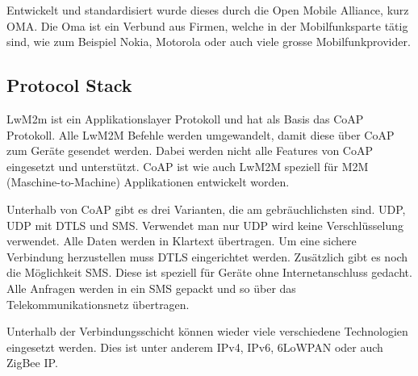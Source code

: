 Entwickelt und standardisiert wurde dieses durch die Open Mobile Alliance, kurz OMA. Die Oma ist ein Verbund aus Firmen, welche in der Mobilfunksparte tätig sind, wie zum Beispiel Nokia, Motorola oder auch viele grosse Mobilfunkprovider. 

\subsection{Protocol Stack}

LwM2m ist ein Applikationslayer Protokoll und hat als Basis das CoAP Protokoll. Alle LwM2M Befehle werden umgewandelt, damit diese über CoAP zum Geräte gesendet werden. Dabei werden nicht alle Features von CoAP eingesetzt und unterstützt. CoAP ist wie auch LwM2M speziell für M2M (Maschine-to-Machine) Applikationen entwickelt worden.

Unterhalb von CoAP gibt es drei Varianten, die am gebräuchlichsten sind. UDP, UDP mit DTLS und SMS. Verwendet man nur UDP wird keine Verschlüsselung verwendet. Alle Daten werden in Klartext übertragen. Um eine sichere Verbindung herzustellen muss DTLS eingerichtet werden. Zusätzlich gibt es noch die Möglichkeit SMS. Diese ist speziell für Geräte ohne Internetanschluss gedacht. Alle Anfragen werden in ein SMS gepackt und so über das Telekommunikationsnetz übertragen.

Unterhalb der Verbindungsschicht können wieder viele verschiedene Technologien eingesetzt werden. Dies ist unter anderem IPv4, IPv6, 6LoWPAN oder auch ZigBee IP. 

